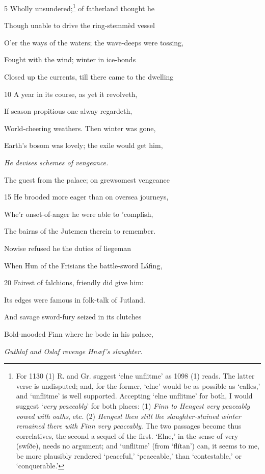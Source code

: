 5
Wholly unsundered;\footnote{For 1130 (1) R. and Gr. suggest ‘elne unflitme’ as 1098 (1) reads. The
latter verse is undisputed; and, for the former, ‘elne’ would be as possible as
‘ealles,’ and ‘unflitme’ is well supported. Accepting ‘elne unflitme’ for both,
I would suggest ‘\emph{very peaceably}’ for both places: (1) \emph{Finn to Hengest very
peaceably vowed with oaths}, etc. (2) \emph{Hengest then still the slaughter-stained
winter remained there with Finn very peaceably}. The two passages become
thus correlatives, the second a sequel of the first. ‘Elne,’ in the sense of very
(swíðe), needs no argument; and ‘unflitme’ (from ‘flítan’) can, it seems to
me, be more plausibly rendered ‘peaceful,’ ‘peaceable,’ than ‘contestable,’ or
‘conquerable.’} of fatherland thought he

Though unable to drive the ring-stemmèd vessel

O’er the ways of the waters; the wave-deeps were tossing,

Fought with the wind; winter in ice-bonds

Closed up the currents, till there came to the dwelling

10
A year in its course, as yet it revolveth,

If season propitious one alway regardeth,

World-cheering weathers. Then winter was gone,

Earth’s bosom was lovely; the exile would get him,

\emph{He devises
schemes of vengeance.}

The guest from the palace; on grewsomest vengeance

15
He brooded more eager than on oversea journeys,

Whe’r onset-of-anger he were able to ’complish,

The bairns of the Jutemen therein to remember.

Nowise refused he the duties of liegeman

When Hun of the Frisians the battle-sword Láfing,

20
Fairest of falchions, friendly did give him:

Its edges were famous in folk-talk of Jutland.

And savage sword-fury seized in its clutches

Bold-mooded Finn where he bode in his palace,

\emph{Guthlaf and Oslaf
revenge Hnæf’s
slaughter.}

